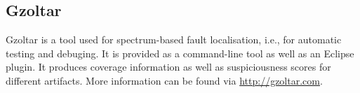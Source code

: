 \subsection{Gzoltar}
\label{sec:gzoltar}

Gzoltar is a tool used for spectrum-based fault localisation, i.e., for
automatic testing and debuging. It is provided as a command-line tool as well as
an Eclipse plugin. It produces coverage information as well as suspiciousness
scores for different artifacts. More information can be found via
\url{http://gzoltar.com}.